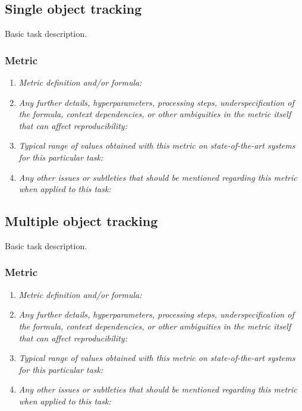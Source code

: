 \documentclass[a4paper,11pt]{article}
\begin{document}
    \subsection{Single object tracking}
        Basic task description.
        \subsubsection{Metric}
            \begin{enumerate}[label=\alph*.]
                \item \textit{Metric definition and/or formula:}
                \bigskip
                \item \textit{Any further details, hyperparameters, processing steps, underspecification of the formula, context dependencies, or other ambiguities in the metric itself that can affect reproducibility:}
                \bigskip
                \item \textit{Typical range of values obtained with this metric on state-of-the-art systems for this particular task:}
                \bigskip
                \item \textit{Any other issues or subtleties that should be mentioned regarding this metric when applied to this task:}
                \bigskip
            \end{enumerate}

    \subsection{Multiple object tracking}
        Basic task description.
        \subsubsection{Metric}
            \begin{enumerate}[label=\alph*.]
                \item \textit{Metric definition and/or formula:}
                \bigskip
                \item \textit{Any further details, hyperparameters, processing steps, underspecification of the formula, context dependencies, or other ambiguities in the metric itself that can affect reproducibility:}
                \bigskip
                \item \textit{Typical range of values obtained with this metric on state-of-the-art systems for this particular task:}
                \bigskip
                \item \textit{Any other issues or subtleties that should be mentioned regarding this metric when applied to this task:}
                \bigskip
            \end{enumerate}
\end{document}
